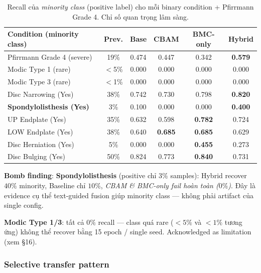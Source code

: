 \documentclass[11pt,a4paper]{article}
\newcommand{\best}[1]{\textcolor{best}{\textbf{#1}}}
\begin{document}
\begin{table}[h]
\centering
\caption{Recall của \emph{minority class} (positive label) cho mỗi
binary condition + Pfirrmann Grade 4. Chỉ số quan trọng lâm sàng.}
\label{tab:spider_minority_recall}
\small
\begin{tabular}{@{}lccccc@{}}
\toprule
\rowcolor{tablehdr}
Condition (minority class) & Prev. & Base & CBAM & BMC-only & Hybrid \\
\midrule
Pfirrmann Grade 4 (severe)         & 19\% & 0.474 & 0.447 & 0.342 & \best{0.579} \\
Modic Type 1 (rare)                & $<$5\%& 0.000 & 0.000 & 0.000 & 0.000 \\
Modic Type 3 (rare)                & $<$1\%& 0.000 & 0.000 & 0.000 & 0.000 \\
Disc Narrowing (Yes)               & 38\% & 0.742 & 0.730 & 0.798 & \best{0.820} \\
\textbf{Spondylolisthesis (Yes)}   & 3\%  & 0.100 & 0.000 & 0.000 & \best{0.400} \\
UP Endplate (Yes)                  & 35\% & 0.632 & 0.598 & \best{0.782} & 0.724 \\
LOW Endplate (Yes)                 & 38\% & 0.640 & \best{0.685} & \best{0.685} & 0.629 \\
Disc Herniation (Yes)              & 5\%  & 0.000 & 0.000 & \best{0.455} & 0.273 \\
Disc Bulging (Yes)                 & 50\% & 0.824 & 0.773 & \best{0.840} & 0.731 \\
\bottomrule
\end{tabular}
\end{table}

\noindent\textbf{Bomb finding}: \textbf{Spondylolisthesis} (positive
chỉ $3\%$ samples): Hybrid recover $40\%$ minority, Baseline chỉ
$10\%$, \emph{CBAM \& BMC-only fail hoàn toàn ($0\%$)}. Đây là evidence
cụ thể text-guided fusion giúp minority class --- không phải artifact
của single config.

\noindent\textbf{Modic Type 1/3}: tất cả $0\%$ recall --- class quá
rare ($<5\%$ và $<1\%$ tương ứng) không thể recover bằng 15 epoch /
single seed. Acknowledged as limitation (xem §16).

\subsubsection*{Selective transfer pattern}
\end{document}
